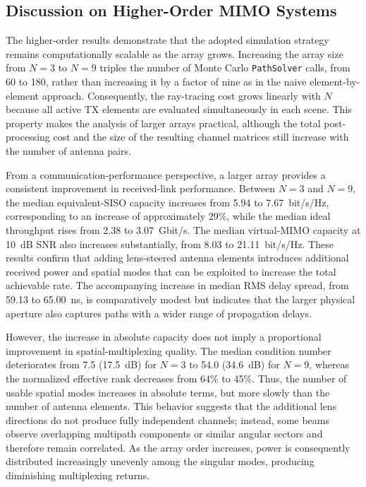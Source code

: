 \subsection{Discussion on Higher-Order MIMO Systems}

The higher-order results demonstrate that the adopted simulation strategy remains computationally scalable as the array grows. Increasing the array size from $N=3$ to $N=9$ triples the number of Monte Carlo \texttt{PathSolver} calls, from 60 to 180, rather than increasing it by a factor of nine as in the naive element-by-element approach. Consequently, the ray-tracing cost grows linearly with $N$ because all active TX elements are evaluated simultaneously in each scene. This property makes the analysis of larger arrays practical, although the total post-processing cost and the size of the resulting channel matrices still increase with the number of antenna pairs.

From a communication-performance perspective, a larger array provides a consistent improvement in received-link performance. Between $N=3$ and $N=9$, the median equivalent-SISO capacity increases from 5.94 to 7.67~bit/s/Hz, corresponding to an increase of approximately 29\%, while the median ideal throughput rises from 2.38 to 3.07~Gbit/s. The median virtual-MIMO capacity at 10~dB SNR also increases substantially, from 8.03 to 21.11~bit/s/Hz. These results confirm that adding lens-steered antenna elements introduces additional received power and spatial modes that can be exploited to increase the total achievable rate. The accompanying increase in median RMS delay spread, from 59.13 to 65.00~ns, is comparatively modest but indicates that the larger physical aperture also captures paths with a wider range of propagation delays.

However, the increase in absolute capacity does not imply a proportional improvement in spatial-multiplexing quality. The median condition number deteriorates from 7.5 (17.5~dB) for $N=3$ to 54.0 (34.6~dB) for $N=9$, whereas the normalized effective rank decreases from 64\% to 45\%. Thus, the number of usable spatial modes increases in absolute terms, but more slowly than the number of antenna elements. This behavior suggests that the additional lens directions do not produce fully independent channels; instead, some beams observe overlapping multipath components or similar angular sectors and therefore remain correlated. As the array order increases, power is consequently distributed increasingly unevenly among the singular modes, producing diminishing multiplexing returns.

